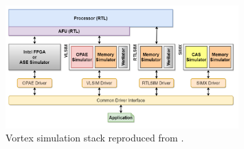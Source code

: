 
\begin{figure}
    \centering
    \includegraphics[width=0.8\textwidth]{figures/simstack.png}
    \caption[Vortex simulation stack]{Vortex simulation stack reproduced from \cite{vortex}.}
    \label{fig:simstack}
\end{figure}

